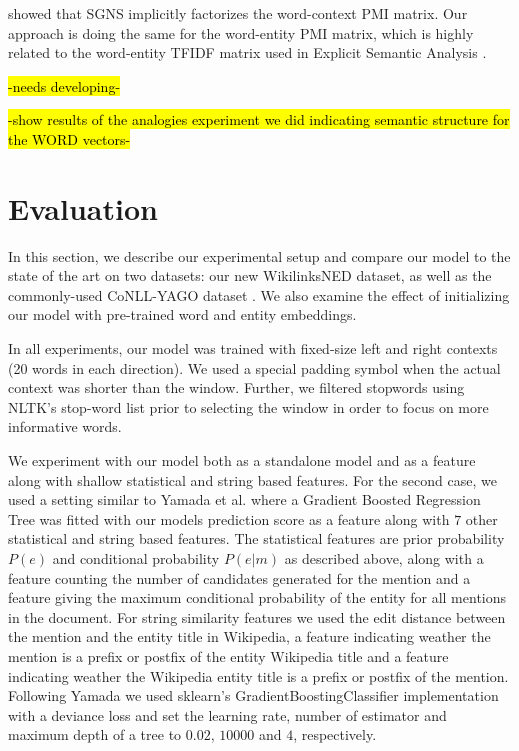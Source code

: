 \documentclass[11pt]{article}
\begin{document}
 showed that SGNS implicitly factorizes the word-context PMI matrix. Our approach is doing the same for the word-entity PMI matrix, which is highly related to the word-entity TFIDF matrix used in Explicit Semantic Analysis \cite{gabrilovich2007computing}.

\hl{-needs developing-}

\hl{-show results of the analogies experiment we did indicating semantic structure for the WORD vectors-}


\section{Evaluation}
\label{experiments}

In this section, we describe our experimental setup and compare our model to the state of the art on two datasets: our new WikilinksNED dataset, as well as the commonly-used CoNLL-YAGO dataset \cite{hoffart2011robust}. We also examine the effect of initializing our model with pre-trained word and entity embeddings.

In all experiments, our model was trained with fixed-size left and right contexts (20 words in each direction). We used a special padding symbol when the actual context was shorter than the window. Further, we filtered stopwords using NLTK's stop-word list prior to selecting the window in order to focus on more informative words.

We experiment with our model both as a standalone model and as a feature along with shallow statistical and string based features. For the second case, we used a setting similar to Yamada et al.  where a Gradient Boosted Regression Tree was fitted with our models prediction score as a feature along with $7$ other statistical and string based features. The statistical features are prior probability $P(e)$ and conditional probability $P(e|m)$ as described above, along with a feature counting the number of candidates generated for the mention and a feature giving the maximum conditional probability of the entity for all mentions in the document. For string similarity features we used the edit distance between the mention and the entity title in Wikipedia, a feature indicating weather the mention is a prefix or postfix of the entity Wikipedia title and a feature indicating weather the Wikipedia entity title is a prefix or postfix of the mention. Following Yamada we used sklearn's GradientBoostingClassifier implementation \cite{pedregosa2011scikit} with a deviance loss and set the learning rate, number of estimator and maximum depth of a tree to $0.02$, $10000$ and $4$, respectively. 
\end{document}
